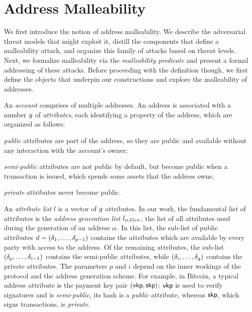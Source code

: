 \section{Address Malleability}\label{subsec:malleability_predicate}

We first introduce the notion of address malleability. We describe the
adversarial threat models that might exploit it, distill the components that
define a malleability attack, and organize this family of attacks based on
threat levels. Next, we formalize malleability via the \emph{malleability
predicate} and present a formal addressing of these attacks. Before proceeding
with the definition though, we first define the objects that underpin our
constructions and explore the malleability of addresses.

An \emph{account} comprises of multiple addresses.  An address is associated
with a number $g$ of \emph{attributes}, each identifying a
property of the address, which are organized as follows:
\begin{inparaenum}[i)]
    \item \emph{public} attributes are part of the address, so they are public
        and available without any interaction with the account's owner;
    \item \emph{semi-public} attributes are not public by default, but become
        public when a transaction is issued, which spends some assets that the
        address owns;
    \item \emph{private} attributes never become public.
\end{inparaenum}
An \emph{attribute list} $l$ is a vector of $g$ attributes. In our
work, the fundamental list of attributes is the \emph{address generation list}
$l_{\alpha, Gen}$, \ie the list of all attributes used during the generation of
an address $\alpha$. In this list, the sub-list of public attributes $d =
(\delta_1, \ldots, \delta_{p-1})$ contains the attributes which are
available by every party with access to the address. Of the remaining
attributes, the sub-list $(\delta_p, \ldots, \delta_{i-1})$ contains
the semi-public attributes, while $(\delta_i, \ldots,
\delta_g)$ contains the private attributes. The parameters $p$
and $i$ depend on the inner workings of the protocol and the address generation
scheme. For example, in Bitcoin, a typical address attribute is the payment key
pair $(\mathsf{vkp}, \mathsf{skp})$: $\mathsf{vkp}$ is used to verify signatures and is
\emph{semi-public}, its hash is a \emph{public} attribute, whereas
$\mathsf{skp}$, which signs transactions, is \emph{private}.

